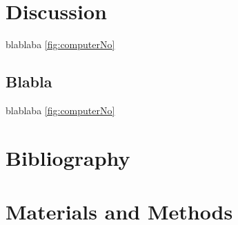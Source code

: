 \documentclass[times, twoside, watermark]{zHenriquesLab-StyleBioRxiv}
\begin{document}
\section*{Discussion}

blablaba \ref{fig:computerNo} 
\blindtext

\subsection*{Blabla} 
\blindtext


blablaba \ref{fig:computerNo}
\blindtext

\begin{acknowledgements}
\blindtext
\end{acknowledgements}

\section*{Bibliography}


\onecolumn
\newpage

\section*{Materials and Methods}
\end{document}
